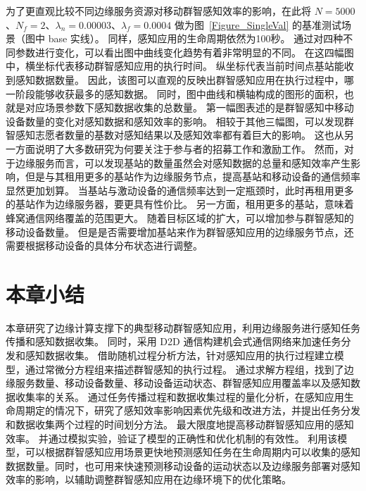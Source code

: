 为了更直观比较不同边缘服务资源对移动群智感知效率的影响，在此将 $N=5000$、$N_f=2$、$\lambda_n = 0.00003$、$\lambda_f=0.0004$ 做为图~\ref{Figure_SingleVal} 的基准测试场景（图中 base 实线）。
同样，感知应用的生命周期依然为100秒。
通过对四种不同参数进行变化，可以看出图中曲线变化趋势有着非常明显的不同。
在这四幅图中，横坐标代表移动群智感知应用的执行时间。
纵坐标代表当前时间点基站能收到感知数据数量。
因此，该图可以直观的反映出群智感知应用在执行过程中，哪一阶段能够收获最多的感知数据。
同时，图中曲线和横轴构成的图形的面积，也就是对应场景参数下感知数据收集的总数量。
第一幅图表述的是群智感知中移动设备数量的变化对感知数据和感知效率的影响。
相较于其他三幅图，可以发现群智感知志愿者数量的基数对感知结果以及感知效率都有着巨大的影响。
这也从另一方面说明了大多数研究为何要关注于参与者的招募工作和激励工作。
然而，对于边缘服务而言，可以发现基站的数量虽然会对感知数据的总量和感知效率产生影响，但是与其租用更多的基站作为边缘服务节点，提高基站和移动设备的通信频率显然更加划算。
当基站与激动设备的通信频率达到一定瓶颈时，此时再租用更多的基站作为边缘服务器，要更具有性价比。
另一方面，租用更多的基站，意味着蜂窝通信网络覆盖的范围更大。
随着目标区域的扩大，可以增加参与群智感知的移动设备数量。
但是是否需要增加基站来作为群智感知应用的边缘服务节点，还需要根据移动设备的具体分布状态进行调整。

\section{本章小结}

本章研究了边缘计算支撑下的典型移动群智感知应用，利用边缘服务进行感知任务传播和感知数据收集。
同时，采用 D2D 通信构建机会式通信网络来加速任务分发和感知数据收集。
借助随机过程分析方法，针对感知应用的执行过程建立模型，通过常微分方程组来描述群智感知的执行过程。
通过求解方程组，找到了边缘服务数量、移动设备数量、移动设备运动状态、群智感知应用覆盖率以及感知数据收集率的关系。
通过任务传播过程和数据收集过程的量化分析，在感知应用生命周期定的情况下，研究了感知效率影响因素优先级和改进方法，并提出任务分发和数据收集两个过程的时间划分方法。
最大限度地提高移动群智感知应用的感知效率。
并通过模拟实验，验证了模型的正确性和优化机制的有效性。
利用该模型，可以根据群智感知应用场景更快地预测感知任务在生命周期内可以收集的感知数据数量。同时，也可用来快速预测移动设备的运动状态以及边缘服务部署对感知效率的影响，以辅助调整群智感知应用在边缘环境下的优化策略。
